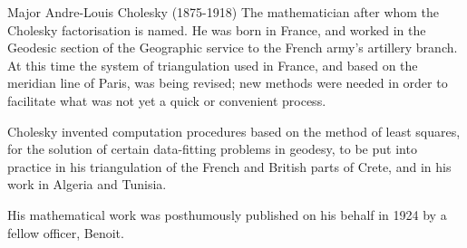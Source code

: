 Major Andre-Louis Cholesky (1875-1918)
The mathematician after whom the Cholesky factorisation is named. He was born in France,
and worked in the Geodesic section of the Geographic service to the French army's artillery
branch. At this time the system of triangulation used in France, and based on the meridian
line of Paris, was being revised; new methods were needed in order to facilitate what was
not yet a quick or convenient process.
\par
Cholesky invented computation procedures based on the method of
least squares, for the solution of certain data-fitting problems in geodesy, to be put into practice in his triangulation of the French and British parts of Crete, and in his work in Algeria and Tunisia.
\par
His mathematical work was
posthumously published on his behalf in 1924 by a fellow officer,
Benoit.